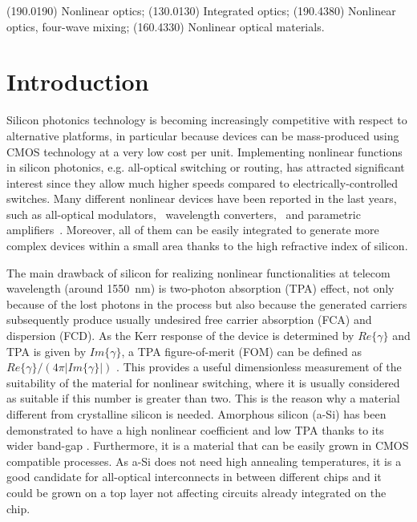 \begin{center}
{(190.0190) Nonlinear optics; (130.0130) Integrated optics; (190.4380) Nonlinear optics, four-wave mixing; (160.4330) Nonlinear optical materials.}
\end{center}

\section{Introduction}
Silicon photonics technology is becoming increasingly competitive with respect to alternative platforms, in particular because devices can be mass-produced using CMOS technology at a very low cost per unit. Implementing nonlinear functions in silicon photonics, e.g. all-optical switching or routing, has attracted significant interest since they allow much higher speeds compared to electrically-controlled switches. Many different nonlinear devices have been reported in the last years, such as all-optical modulators,~\cite{Almeida2004b} wavelength converters,~\cite{Lee2009} and parametric amplifiers~\cite{Kuyken2011a}. Moreover, all of them can be easily integrated to generate more complex devices within a small area thanks to the high refractive index of silicon.


The main drawback of silicon for realizing nonlinear functionalities at telecom wavelength (around 1550~nm) is two-photon absorption (TPA) effect, not only because of the lost photons in the process but also because the generated carriers subsequently produce usually undesired free carrier absorption (FCA) and dispersion (FCD).
As the Kerr response of the device is determined by $Re\{\gamma\}$ and TPA is given by $Im\{\gamma\}$, a TPA figure-of-merit (FOM) can be defined as $Re\{\gamma\}/(4\pi |Im\{\gamma\}|)$  \cite{Mizrahi1989}. This provides a useful dimensionless measurement of the suitability of the material for nonlinear switching, where it is usually considered as suitable if this number is greater than two.
This is the reason why a material different from crystalline silicon is needed.
Amorphous silicon (a-Si) has been demonstrated to have a high nonlinear coefficient \cite{Narayanan2010} and low TPA thanks to its wider band-gap \cite{OLeary1997}.
Furthermore, it is a material that can be easily grown in CMOS compatible processes.
As a-Si does not need high annealing temperatures, it is a good candidate for all-optical interconnects in between different chips and it could be grown on a top layer not affecting circuits already integrated on the chip.



